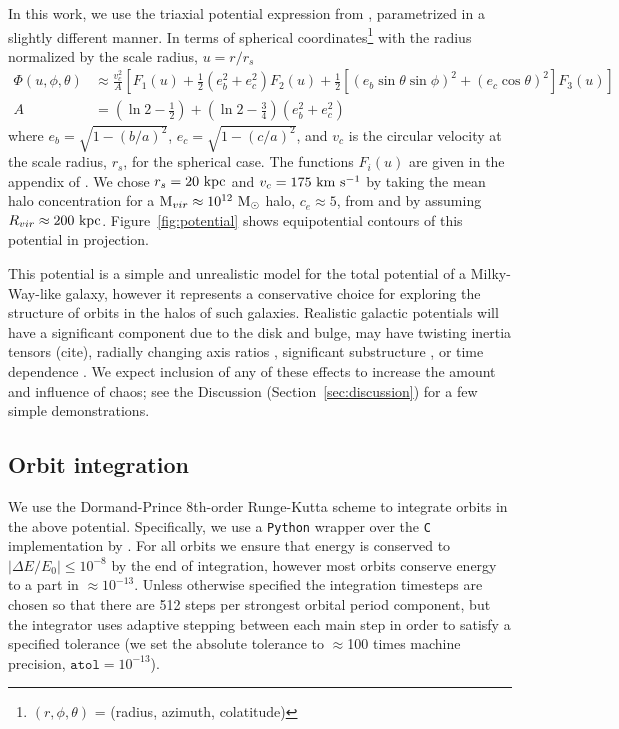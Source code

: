 \documentclass[letterpaper,12pt,preprint]{aastex}
\newcommand{\msun}{\ensuremath{\mathrm{M}_\odot}}
\begin{document}
In this work, we use the triaxial potential expression from \citet{leesuto03}, parametrized in a slightly different manner. In terms of spherical coordinates\footnote{$(r,\phi,\theta)$ = (radius, azimuth, colatitude)} with the radius normalized by the scale radius, $u = r/r_s$
\begin{align}
	\Phi(u,\phi,\theta) &\approx \frac{v_c^2}{A}\left[F_1(u) + \frac{1}{2}(e_b^2 + e_c^2)F_2(u) + \frac{1}{2} [(e_b\sin\theta \sin\phi)^2 + (e_c\cos\theta)^2] F_3(u) \right]\\
	A &= \left(\ln2 - \frac{1}{2}\right) + \left(\ln2-\frac{3}{4}\right) (e_b^2 + e_c^2)
\end{align}
where $e_b = \sqrt{1 - (b/a)^2}$, $e_c = \sqrt{1 - (c/a)^2}$, and $v_c$ is the circular velocity at the scale radius, $r_s$, for the spherical case. The functions $F_i(u)$ are given in the appendix of \cite{leesuto03}. We chose $r_s=20~{\rm kpc}$ and $v_c = 175~{\rm km}~{\rm s}^{-1}$ by taking the mean halo concentration for a ${\rm M}_{vir} \approx 10^{12}~\msun$ halo, $c_e\approx5$, from \cite{jing02} and by assuming $R_{vir}\approx200~{\rm kpc}$. Figure~\ref{fig:potential} shows equipotential contours of this potential in projection.

This potential is a simple and unrealistic model for the total potential of a Milky-Way-like galaxy, however it represents a conservative choice for exploring the structure of orbits in the halos of such galaxies. Realistic galactic potentials will have a significant component due to the disk and bulge, may have twisting inertia tensors (cite), radially changing axis ratios \citep[e.g.,][]{kazantzidis04,debattista08,veraciro11, NiHao}, significant substructure \citep{moore98,zemp09}, or time dependence \citep[either from bulk rotation, mass growth, mergers, etc.][]{bailin05}. We expect inclusion of any of these effects to increase the amount and influence of chaos; see the Discussion (Section~\ref{sec:discussion}) for a few simple demonstrations.

\subsection{Orbit integration}\label{sec:integration}

We use the Dormand-Prince 8th-order Runge-Kutta scheme \citep{prince81} to integrate orbits in the above potential. Specifically, we use a \texttt{Python} wrapper over the \texttt{C} implementation by \cite{hairer93}. For all orbits we ensure that energy is conserved to $|\Delta E/E_0| \leq 10^{-8}$ by the end of integration, however most orbits conserve energy to a part in $\approx$$10^{-13}$. Unless otherwise specified the integration timesteps are chosen so that there are 512 steps per strongest orbital period component, but the integrator uses adaptive stepping between each main step in order to satisfy a specified tolerance (we set the absolute tolerance to $\approx$100 times machine precision, $\texttt{atol} = 10^{-13}$). 
\end{document}
